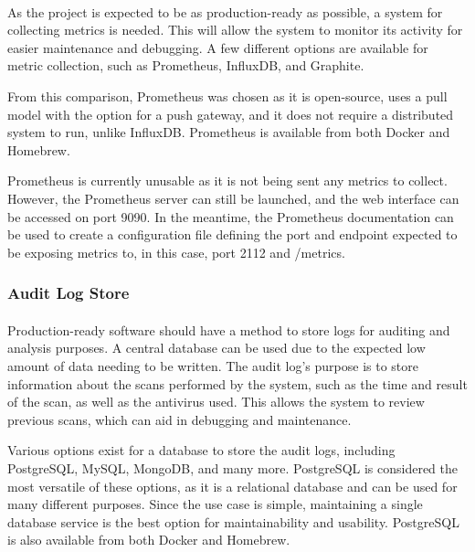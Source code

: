 \documentclass[12pt, conference, final, a4paper, onecolumn, compsoc]{IEEEtran}
\begin{document}
\paragraph{}

As the project is expected to be as production-ready as possible, a system for
collecting metrics is needed. This will allow the system to monitor its activity
for easier maintenance and debugging. A few different options are available for
metric collection, such as Prometheus, InfluxDB, and Graphite.



From this comparison, Prometheus was chosen as it is open-source, uses a pull
model with the option for a push gateway, and it does not require a distributed
system to run, unlike InfluxDB. Prometheus is available from both Docker and
Homebrew.

Prometheus is currently unusable as it is not being sent any metrics to collect.
However, the Prometheus server can still be launched, and the web interface can
be accessed on port 9090. In the meantime, the Prometheus documentation can be
used to create a configuration file defining the port and endpoint expected to
be exposing metrics to, in this case, port 2112 and /metrics.



\subsubsection*{Audit Log Store}
\paragraph{}

Production-ready software should have a method to store logs for auditing and
analysis purposes. A central database can be used due to the expected low amount
of data needing to be written. The audit log's purpose is to store information
about the scans performed by the system, such as the time and result of the
scan, as well as the antivirus used. This allows the system to review previous
scans, which can aid in debugging and maintenance.

Various options exist for a database to store the audit logs, including
PostgreSQL, MySQL, MongoDB, and many more. PostgreSQL is considered the most
versatile of these options, as it is a relational database and can be used for
many different purposes. Since the use case is simple, maintaining a single
database service is the best option for maintainability and usability.
PostgreSQL is also available from both Docker and Homebrew.
\end{document}
